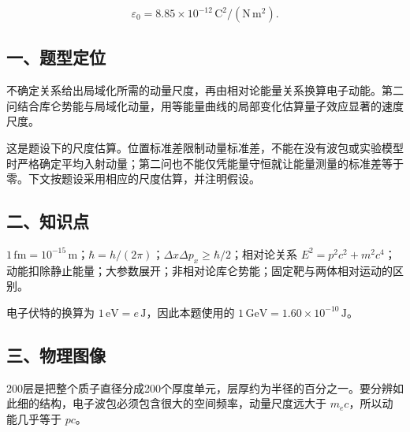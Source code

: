 \documentclass[12pt,a4paper,fontset=fandol]{ctexart}
\begin{document}
\[\varepsilon_0=8.85\times10^{-12}\,\mathrm{C^2/(N\,m^2)}.\]

\subsection{一、题型定位}\label{ux4e00ux9898ux578bux5b9aux4f4d-3}

不确定关系给出局域化所需的动量尺度，再由相对论能量关系换算电子动能。第二问结合库仑势能与局域化动量，用等能量曲线的局部变化估算量子效应显著的速度尺度。

这是题设下的尺度估算。位置标准差限制动量标准差，不能在没有波包或实验模型时严格确定平均入射动量；第二问也不能仅凭能量守恒就让能量测量的标准差等于零。下文按题设采用相应的尺度估算，并注明假设。

\subsection{二、知识点}\label{ux4e8cux77e5ux8bc6ux70b9-3}

\(1\,\mathrm{fm}=10^{-15}\,\mathrm m\)；\(\hbar=h/(2\pi)\)；\(\Delta x\Delta p_x\ge\hbar/2\)；相对论关系
\(E^2=p^2c^2+m^2c^4\)；动能扣除静止能量；大参数展开；非相对论库仑势能；固定靶与两体相对运动的区别。

电子伏特的换算为 \(1\,\mathrm{eV}=e\,\mathrm J\)，因此本题使用的
\(1\,\mathrm{GeV}=1.60\times10^{-10}\,\mathrm J\)。

\subsection{三、物理图像}\label{ux4e09ux7269ux7406ux56feux50cf-3}

200层是把整个质子直径分成200个厚度单元，层厚约为半径的百分之一。要分辨如此细的结构，电子波包必须包含很大的空间频率，动量尺度远大于
\(m_ec\)，所以动能几乎等于 \(pc\)。

\begin{center}
\begin{minipage}{\linewidth}
\centering\begingroup
{}
\ifdim\wd\diagrambox>.88\linewidth
\sbox{\diagrambox}{\resizebox{.88\linewidth}{!}{\usebox{\diagrambox}}}
\fi
\ifdim\ht\diagrambox>.40\textheight
\resizebox{!}{.40\textheight}{\usebox{\diagrambox}}
\else\usebox{\diagrambox}\fi
\par{}
\endgroup\end{minipage}
\end{center}
\end{document}
